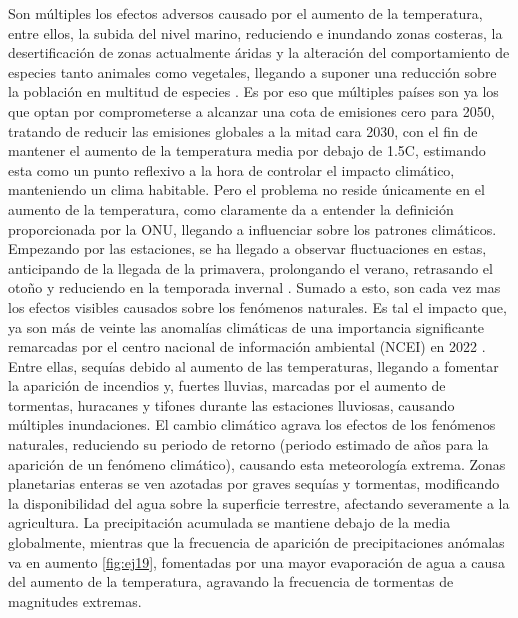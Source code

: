 Son múltiples los efectos adversos causado por el aumento de la temperatura, entre ellos, la subida del nivel marino, reduciendo e inundando zonas costeras, la desertificación de zonas actualmente áridas y la alteración del comportamiento de especies tanto animales como vegetales, llegando a suponer una reducción sobre la población en multitud de especies \cite{arnell2019global} \cite{new2011four}. Es por eso que múltiples países son ya los que optan por comprometerse a alcanzar una cota de emisiones cero para 2050, tratando de reducir las emisiones globales a la mitad cara 2030, con el fin de mantener el aumento de la temperatura media por debajo de 1.5\textdegree C, estimando esta como un punto reflexivo a la hora de controlar el impacto climático, manteniendo un clima habitable.\newline
\newline
Pero el problema no reside únicamente en el aumento de la temperatura, como claramente da a entender la definición proporcionada por la ONU, llegando a influenciar sobre los patrones climáticos. Empezando por las estaciones, se ha llegado a observar fluctuaciones en estas, anticipando de la llegada de la primavera, prolongando el verano, retrasando el otoño y reduciendo en la temporada invernal \cite{sparks2002observed}.\newline
\newline
Sumado a esto, son cada vez mas los efectos visibles causados sobre los fenómenos naturales. Es tal el impacto que, ya son más de veinte las anomalías climáticas de una importancia significante remarcadas por el centro nacional de información ambiental (NCEI) en 2022 \cite{NCEIWeb}. Entre ellas, sequías debido al aumento de las temperaturas, llegando a fomentar la aparición de incendios y, fuertes lluvias, marcadas por el aumento de tormentas, huracanes y tifones durante las estaciones lluviosas, causando múltiples inundaciones.\newline
\newline
El cambio climático agrava los efectos de los fenómenos naturales, reduciendo su periodo de retorno (periodo estimado de años para la aparición de un fenómeno climático), causando esta meteorología extrema. Zonas planetarias enteras se ven azotadas por graves sequías y tormentas, modificando la disponibilidad del agua sobre la superficie terrestre, afectando severamente a la agricultura. La precipitación acumulada se mantiene debajo de la media globalmente, mientras que la frecuencia de aparición de precipitaciones anómalas va en aumento \ref{fig:ej19}, fomentadas por una mayor evaporación de agua a causa del aumento de la temperatura, agravando la frecuencia de tormentas de magnitudes extremas. 

